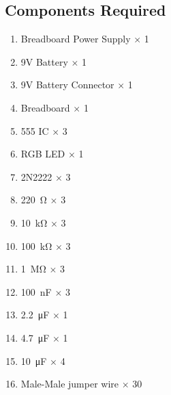 \subsection{Components Required}
\begin{enumerate}
    \item Breadboard Power Supply $\times$ 1
    \item 9V Battery $\times$ 1
    \item 9V Battery Connector $\times$ 1
    \item Breadboard $\times$ 1
    \item 555 IC $\times$ 3
    \item RGB LED $\times$ 1
    \item 2N2222 $\times$ 3
    \item \SI{220}{\ohm} $\times$ 3
    \item \SI{10}{\kilo\ohm} $\times$ 3
    \item \SI{100}{\kilo\ohm} $\times$ 3
    \item \SI{1}{\Mohm} $\times$ 3
    \item \SI{100}{\nano\farad} $\times$ 3
    \item \SI{2.2}{\micro\farad} $\times$ 1
    \item \SI{4.7}{\micro\farad} $\times$ 1
    \item \SI{10}{\micro\farad} $\times$ 4
    \item Male-Male jumper wire $\times$ 30
\end{enumerate}
